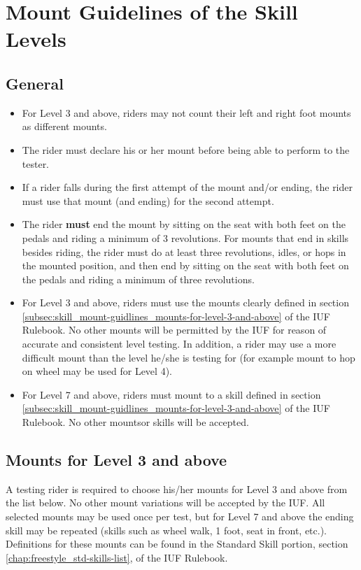 \section{Mount Guidelines of the Skill Levels}

\subsection{General}
\begin{itemize}
\item For Level 3 and above, riders may not count their left and right foot mounts as different mounts.
\item The rider must declare his or her mount before being able to perform to the tester.
\item If a rider falls during the first attempt of the mount and/or ending, the rider must use that mount (and ending) for the second attempt.
\item The rider \textbf{must} end the mount by sitting on the seat with both feet on the pedals and riding a minimum of 3 revolutions.
For mounts that end in skills besides riding, the rider must do at least three revolutions, idles, or hops in the mounted position, and then end by sitting on the seat with both feet on the pedals and riding a minimum of three revolutions.
\item For Level 3 and above, riders must use the mounts clearly defined in section \ref{subsec:skill_mount-guidlines_mounts-for-level-3-and-above} of the IUF Rulebook.
No other mounts will be permitted by the IUF for reason of accurate and consistent level testing.
In addition, a rider may use a more difficult mount than the level he/she is testing for (for example mount to hop on wheel may be used for Level 4).
\item For Level 7 and above, riders must mount to a skill defined in section \ref{subsec:skill_mount-guidlines_mounts-for-level-3-and-above} of the IUF Rulebook.
No other mountsor skills will be accepted.
\end{itemize}


\subsection{Mounts for Level 3 and above \label{subsec:skill_mount-guidlines_mounts-for-level-3-and-above}}
A testing rider is required to choose his/her mounts for Level 3 and above from the list below.
No other mount variations will be accepted by the IUF.
All selected mounts may be used once per test, but for Level 7 and above the ending skill may be repeated (skills such as wheel walk, 1 foot, seat in front, etc.).
Definitions for these mounts can be found in the Standard Skill portion, section \ref{chap:freestyle_std-skills-list}, of the IUF Rulebook.

